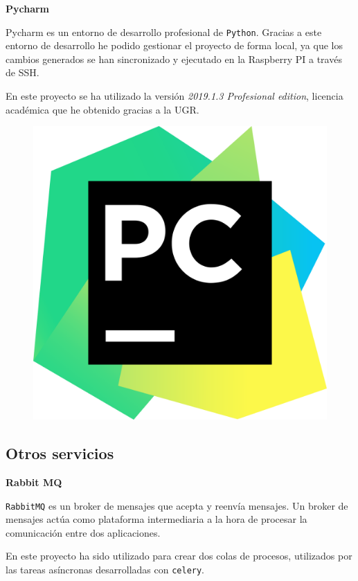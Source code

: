 \textbf{Pycharm}

Pycharm \cite{ref22} es un entorno de desarrollo profesional de \texttt{Python}. Gracias a este entorno de desarrollo he podido gestionar el proyecto de forma local, ya que los cambios generados se han sincronizado y ejecutado en la Raspberry PI a través de SSH.

En este proyecto se ha utilizado la versión \textit{2019.1.3 Profesional edition}, licencia académica que he obtenido gracias a la UGR. 

\begin{figure}[h]
	\centering
	\includegraphics[scale=0.06]{images/18}
\end{figure}


\subsection{Otros servicios}

\textbf{Rabbit MQ} 

\texttt{RabbitMQ} \cite{ref23} es un broker de mensajes que acepta y reenvía mensajes. Un broker de mensajes actúa como plataforma intermediaria a la hora de procesar la comunicación entre dos aplicaciones.

En este proyecto ha sido utilizado para crear dos colas de procesos, utilizados por las tareas asíncronas desarrolladas con \texttt{celery}.

